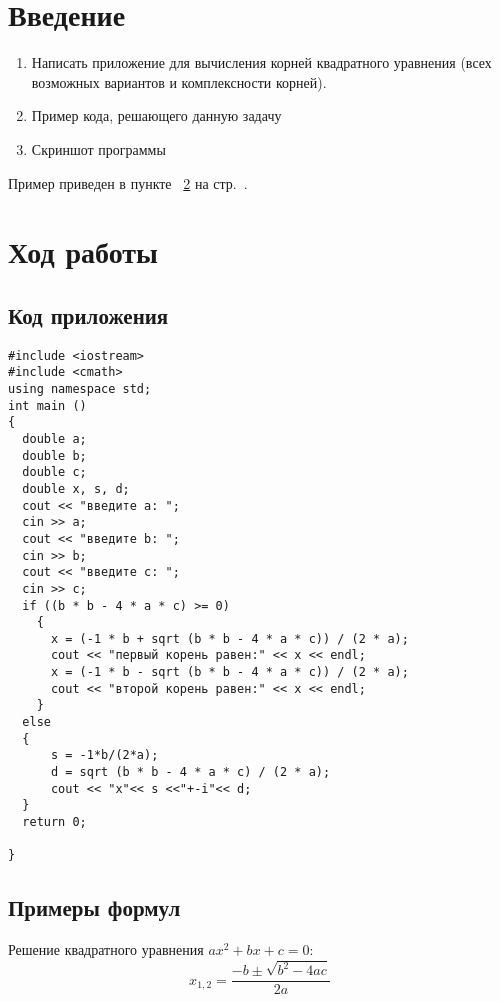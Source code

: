 \documentclass[12pt,a4paper]{scrartcl}
\begin{document}
\section{Введение}
\label{sec:intro}

\begin{enumerate}
 \item Написать приложение для вычисления корней квадратного уравнения (всех возможных вариантов и комплексности корней).
 \item Пример кода, решающего данную задачу
 \item Скриншот программы
\end{enumerate}

Пример приведен в пункте ~\ref{sec:exp} на стр.~\pageref{sec:exp}.

\section{Ход работы}
\label{sec:exp}

\subsection{Код приложения}
\label{sec:exp:code}
\begin{verbatim}
#include <iostream>
#include <cmath>
using namespace std;
int main ()
{
  double a;
  double b;
  double c;
  double x, s, d;
  cout << "введите а: ";
  cin >> a;
  cout << "введите b: ";
  cin >> b;
  cout << "введите c: ";
  cin >> c;
  if ((b * b - 4 * a * c) >= 0)
    {
      x = (-1 * b + sqrt (b * b - 4 * a * c)) / (2 * a);
      cout << "первый корень равен:" << x << endl;
      x = (-1 * b - sqrt (b * b - 4 * a * c)) / (2 * a);
      cout << "второй корень равен:" << x << endl;
    }
  else
  {
      s = -1*b/(2*a);
      d = sqrt (b * b - 4 * a * c) / (2 * a);
      cout << "x"<< s <<"+-i"<< d;
  }
  return 0;
    
}
\end{verbatim}

\subsection{Примеры формул}
\label{sec:mathexample}

Решение квадратного уравнения \(ax^2+bx+c=0\):
\begin{equation}\label{eq:solv}
 x_{1,2}=\frac{-b\pm\sqrt{b^2-4ac}}{2a}
\end{equation}
\end{document}
